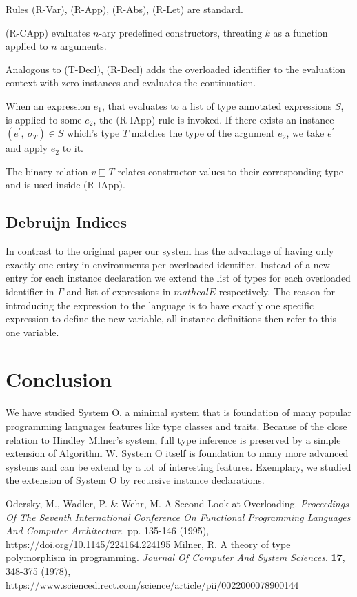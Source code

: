\documentclass[runningheads]{llncs}
\newcommand{\snip}[1]{\footnotesize{\ttfamily{#1}}}
\begin{document}
\noindent Rules (R-Var), (R-App), (R-Abs), (R-Let) are standard. 

(R-CApp) evaluates $n$-ary predefined constructors, threating $k$ as a function applied to $n$ arguments. 

Analogous to (T-Decl), (R-Decl) adds the overloaded identifier to the evaluation context with zero instances and evaluates the continuation.

When an expression $e_1$, that evaluates to a list of type annotated expressions $S$, is applied to some $e_2$, the (R-IApp) rule is invoked. If there exists an instance $(e^\prime, \ \sigma_T) \in S$ which's type $T$ matches the type of the argument $e_2$, we take $e^\prime$ and apply $e_2$ to it. 

The binary relation $v \sqsubseteq T$ relates constructor values to their corresponding type and is used inside (R-IApp).
\subsection{Debruijn Indices}
In contrast to the original paper our system has the advantage of having only exactly one entry in environments per overloaded identifier. Instead of a new entry for each instance declaration we extend the list of types for each overloaded identifier in $\Gamma$ and list of expressions in $mathcal{E}$ respectively. The reason for introducing the \snip{decl} expression to the language is to have exactly one specific expression to define the new variable, all instance definitions then refer to this one variable.

\section{Conclusion}
We have studied System O, a minimal system that is foundation of many popular programming languages features like type classes and traits. Because of the close relation to Hindley Milner's system, full type inference is preserved by a simple extension of Algorithm W. System O itself is foundation to many more advanced systems and can be extend by a lot of interesting features. Exemplary, we studied the extension of System O by recursive instance declarations.

\begin{thebibliography}{8}

Odersky, M., Wadler, P. \& Wehr, M. A Second Look at Overloading. {\em Proceedings Of The Seventh International Conference On Functional Programming Languages And Computer Architecture}. pp. 135-146 (1995), https://doi.org/10.1145/224164.224195
Milner, R. A theory of type polymorphism in programming. {\em Journal Of Computer And System Sciences}. \textbf{17}, 348-375 (1978), https://www.sciencedirect.com/science/article/pii/0022000078900144
\end{thebibliography}
\end{document}
